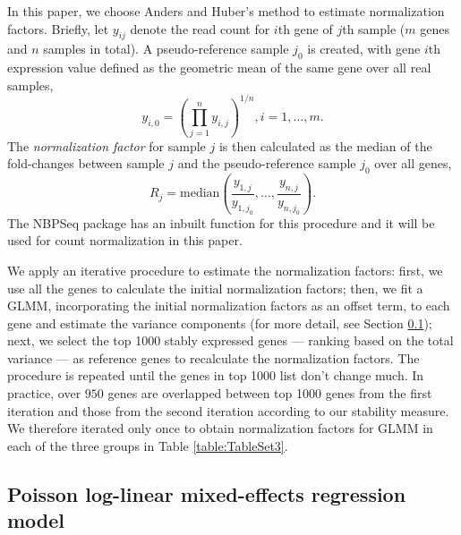 \documentclass[11pt, a4paper]{article}
\begin{document}
In this paper, we choose Anders and Huber's method \citep{anders2010differential} to estimate normalization factors.  Briefly, let $y_{ij}$ denote the read count for $i$th gene of $j$th sample ($m$ genes and $n$ samples in total). A pseudo-reference sample $j_0$ is created, with gene $i$th expression value defined as the geometric mean of the same gene over all real samples, 
\[ y_{i,0} = (\prod_{j=1}^ny_{i,j})^{1/n},  i=1, \ldots, m. \]
 The \textit{normalization factor} for sample $j$ is then calculated as the median of the fold-changes between sample $j$ and the pseudo-reference sample $j_0$ over all genes,
  \begin{equation}\label{eq:normfactors} 
 R_j = \text{median}(\dfrac{y_{1,j}}{y_{1,j_0}}, \ldots, \dfrac{y_{n,j}}{y_{n,j_0}}).
  \end{equation}
 The NBPSeq package \citep{di2014package} has an inbuilt function for this procedure and it will be used for count normalization in this paper. 

We apply an iterative procedure to estimate the normalization factors: first, we use all the genes to calculate the initial normalization factors; then, we fit a GLMM, incorporating the initial normalization factors as an offset term, to each gene and estimate the variance components (for more detail, see Section \ref{subsection:OurMethod}); next, we select the top 1000 stably expressed genes ---  ranking based on the total variance --- as reference genes to recalculate the normalization factors. The procedure is repeated until the genes in top 1000 list don't change much. In practice, over $950$ genes are overlapped between top 1000 genes from the first iteration and those from the second iteration according to our stability measure. We therefore iterated only once to obtain normalization factors for GLMM in each of the three groups in Table \ref{table:TableSet3}.  

\subsection{Poisson log-linear mixed-effects regression model}\label{subsection:OurMethod} 
\end{document}
